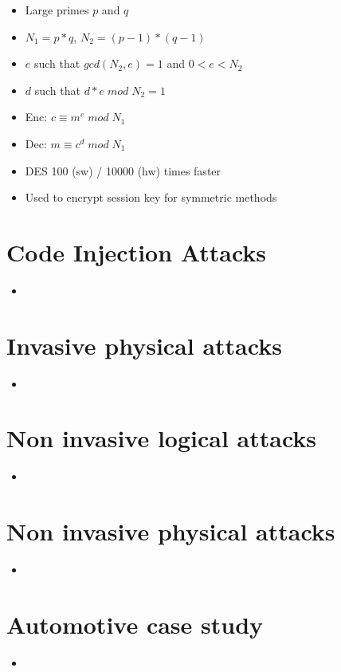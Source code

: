 \documentclass[11pt, paper=a4, twocolumn]{scrartcl}
\begin{document}
\begin{itemize}
\begin{itemize}
					\item Large primes $p$ and $q$
					\item $N_1 = p*q$, $N_2=(p-1)*(q-1)$
					\item $e$ such that $gcd(N_2,e) = 1$ and $0<e<N_2$
					\item $d$ such that $d*e\;mod\;N_2=1$
					\item Enc: $c\equiv m^e\;mod\;N_1$
					\item Dec: $m \equiv c^d\;mod\;N_1$
					\item DES 100 (sw) / 10000 (hw) times faster
					\item Used to encrypt session key for symmetric methods
				\end{itemize}
		\end{itemize}

	\section{Code Injection Attacks}
		\begin{itemize}
			\item 
		\end{itemize}

	\section{Invasive physical attacks}
		\begin{itemize}
			\item 
		\end{itemize}

	\section{Non invasive logical attacks}
		\begin{itemize}
			\item 
		\end{itemize}

	\section{Non invasive physical attacks}
		\begin{itemize}
			\item 
		\end{itemize}

	\section{Automotive case study}
		\begin{itemize}
			\item 
		\end{itemize}
\end{document}
